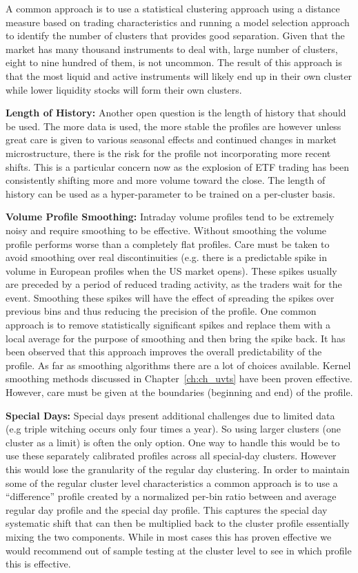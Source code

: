 A common approach is to use a statistical clustering approach using a distance measure based on trading characteristics and running a model selection approach to identify the number of clusters that provides good separation. Given that the market has many thousand instruments to deal with, large number of clusters, eight to nine hundred of them, is not uncommon. The result of this approach is that the most liquid and active instruments will likely end up in their own cluster while lower liquidity stocks will form their own clusters. \twomedskip


\noindent\textbf{Length of History:} Another open question is the length of history that should be used. The more data is used, the more stable the profiles are however unless great care is given to various seasonal effects and continued changes in market microstructure, there is the risk for the profile not incorporating more recent shifts. This is a particular concern now as the explosion of ETF trading has been consistently shifting more and more volume toward the close. The length of history can be used as a hyper-parameter to be trained on a per-cluster basis. \twomedskip


\noindent\textbf{Volume Profile Smoothing:} Intraday volume profiles tend to be extremely noisy and require smoothing to be effective. Without smoothing the volume profile performs worse than a completely flat profiles. Care must be taken to avoid smoothing over real discontinuities (e.g. there is a predictable spike in volume in European profiles when the US market opens). These spikes usually are preceded by a period of reduced trading activity, as the traders wait for the event. Smoothing these spikes will have the effect of spreading the spikes over previous bins and thus reducing the precision of the profile. One common approach is to remove statistically significant spikes and replace them with a local average for the purpose of smoothing and then bring the spike back. It has been observed that this approach improves the overall predictability of the profile. As far as smoothing algorithms there are a lot of choices available. Kernel smoothing methods discussed in Chapter~\ref{ch:ch_uvts} have been proven effective. However, care must be given at the boundaries (beginning and end) of the profile. \twomedskip


\noindent\textbf{Special Days:} Special days present additional challenges due to limited data (e.g triple witching occurs only four times a year). So using larger clusters (one cluster as a limit) is often the only option. One way to handle this would be to use these separately calibrated profiles across all special-day clusters. However this would lose the granularity of the regular day clustering. In order to maintain some of the  regular cluster level characteristics a common approach is to use a ``difference'' profile created by a normalized per-bin ratio between and average regular day profile and the special day profile. This captures the special day systematic shift that can then be multiplied back to the cluster profile essentially mixing the two components. While in most cases this has proven effective we would recommend out of sample testing at the cluster level to see in which profile this is effective. 

